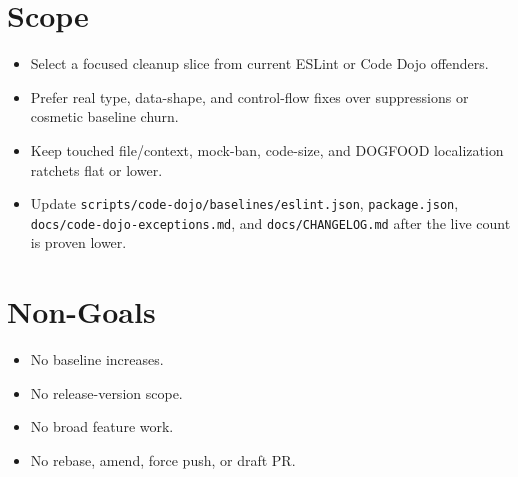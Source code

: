 \section{Scope}\label{record-231-scope}

\begin{itemize}
\tightlist
\item
  Select a focused cleanup slice from current ESLint or Code Dojo offenders.
\item
  Prefer real type, data-shape, and control-flow fixes over suppressions or cosmetic baseline churn.
\item
  Keep touched file/context, mock-ban, code-size, and DOGFOOD localization ratchets flat or lower.
\item
  Update \texttt{s\allowbreak{}c\allowbreak{}r\allowbreak{}i\allowbreak{}p\allowbreak{}t\allowbreak{}s\allowbreak{}/\allowbreak{}c\allowbreak{}o\allowbreak{}d\allowbreak{}e\allowbreak{}-\allowbreak{}d\allowbreak{}o\allowbreak{}j\allowbreak{}o\allowbreak{}/\allowbreak{}b\allowbreak{}a\allowbreak{}s\allowbreak{}e\allowbreak{}l\allowbreak{}i\allowbreak{}n\allowbreak{}e\allowbreak{}s\allowbreak{}/\allowbreak{}e\allowbreak{}s\allowbreak{}l\allowbreak{}i\allowbreak{}n\allowbreak{}t\allowbreak{}.\allowbreak{}j\allowbreak{}s\allowbreak{}o\allowbreak{}n}, \texttt{p\allowbreak{}a\allowbreak{}c\allowbreak{}k\allowbreak{}a\allowbreak{}g\allowbreak{}e\allowbreak{}.\allowbreak{}j\allowbreak{}s\allowbreak{}o\allowbreak{}n}, \texttt{d\allowbreak{}o\allowbreak{}c\allowbreak{}s\allowbreak{}/\allowbreak{}c\allowbreak{}o\allowbreak{}d\allowbreak{}e\allowbreak{}-\allowbreak{}d\allowbreak{}o\allowbreak{}j\allowbreak{}o\allowbreak{}-\allowbreak{}e\allowbreak{}x\allowbreak{}c\allowbreak{}e\allowbreak{}p\allowbreak{}t\allowbreak{}i\allowbreak{}o\allowbreak{}n\allowbreak{}s\allowbreak{}.\allowbreak{}m\allowbreak{}d}, and \texttt{d\allowbreak{}o\allowbreak{}c\allowbreak{}s\allowbreak{}/\allowbreak{}C\allowbreak{}H\allowbreak{}A\allowbreak{}N\allowbreak{}G\allowbreak{}E\allowbreak{}L\allowbreak{}O\allowbreak{}G\allowbreak{}.\allowbreak{}m\allowbreak{}d} after the live count is proven lower.
\end{itemize}

\section{Non-Goals}\label{record-231-non-goals}

\begin{itemize}
\tightlist
\item
  No baseline increases.
\item
  No release-version scope.
\item
  No broad feature work.
\item
  No rebase, amend, force push, or draft PR.
\end{itemize}

